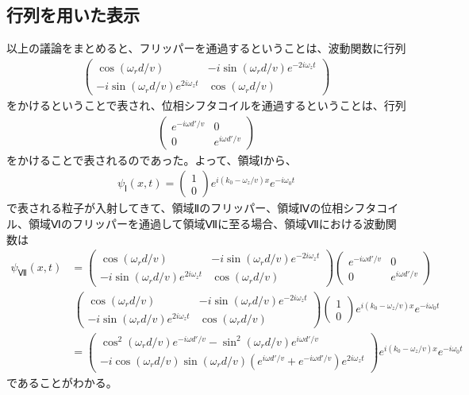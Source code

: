 \subsection{行列を用いた表示}
以上の議論をまとめると、フリッパーを通過するということは、波動関数に行列
\begin{align}
\begin{pmatrix}
\cos({{\omega_{r}}d/v}) &-i\sin({{\omega_{r}}d/v})e^{-2i\omega_{z}t} \\
-i\sin({{\omega_{r}}d/v})e^{2i\omega_{z}t} &\cos({{\omega_{r}}d/v})
\end{pmatrix}
\end{align}
をかけるということで表され、位相シフタコイルを通過するということは、行列
\begin{align}
\begin{pmatrix}
 e^{-i{\omega}d'/v}& 0 \\
 0 &e^{i{\omega}d'/v}
\end{pmatrix}
\end{align}
をかけることで表されるのであった。よって、領域Ⅰから、
\begin{align}
{\psi}_{Ⅰ}(x,t)=
\begin{pmatrix}
1 \\
0
\end{pmatrix}
e^{i(k_{0}-\omega_{z}/v)x}e^{-i\omega_{0}t}
\end{align}
で表される粒子が入射してきて、領域Ⅱのフリッパー、領域Ⅳの位相シフタコイル、領域Ⅵのフリッパーを通過して領域Ⅶに至る場合、領域Ⅶにおける波動関数は
\begin{align}
{\psi}_{Ⅶ}(x,t)
&=\begin{pmatrix}
\cos({{\omega_{r}}d/v}) &-i\sin({{\omega_{r}}d/v})e^{-2i\omega_{z}t} \\
-i\sin({{\omega_{r}}d/v})e^{2i\omega_{z}t} &\cos({{\omega_{r}}d/v})
\end{pmatrix}
\begin{pmatrix}
 e^{-i{\omega}d'/v}& 0 \\
 0 &e^{i{\omega}d'/v}
\end{pmatrix}　\\
&{\ }\begin{pmatrix}
\cos({{\omega_{r}}d/v}) &-i\sin({{\omega_{r}}d/v})e^{-2i\omega_{z}t} \\
-i\sin({{\omega_{r}}d/v})e^{2i\omega_{z}t} &\cos({{\omega_{r}}d/v})
\end{pmatrix}
\begin{pmatrix}
1 \\
0
\end{pmatrix}
e^{i(k_{0}-\omega_{z}/v)x}e^{-i\omega_{0}t} \\
&=\begin{pmatrix}
\cos^{2}(\omega_{r}d/v)e^{-i{\omega}d'/v}-\sin^{2}(\omega_{r}d/v)e^{i{\omega}d'/v} \\
-i\cos({{\omega_{r}}d/v})\sin(\omega_{r}d/v)(e^{i{\omega}d'/v}+e^{-i{\omega}d'/v})e^{2i\omega_{z}t}
\end{pmatrix}
e^{i(k_{0}-\omega_{z}/v)x}e^{-i\omega_{0}t}
\end{align}
であることがわかる。

